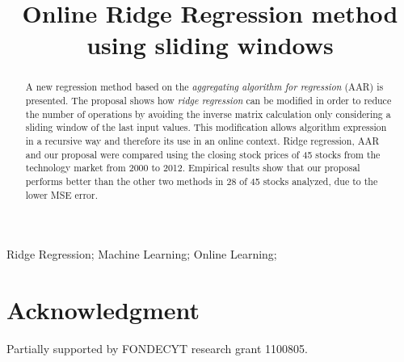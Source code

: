 \documentclass[10pt, conference, compsocconf]{IEEEtran}
\begin{document}
\title{Online Ridge Regression method using sliding windows}

\author{
\and
{}
}


\maketitle


\begin{abstract}
A new regression method based on the {\em aggregating algorithm for
regression} (AAR) is presented. The proposal shows how {\em ridge
regression} can be modified in order to reduce the number of
operations by avoiding the inverse matrix calculation only considering
a sliding window of the last input values. This modification allows
algorithm expression in a recursive way and therefore its use in an
online context. Ridge regression, AAR and our proposal were compared
using the closing stock prices of 45 stocks from the technology market
from 2000 to 2012. Empirical results show that our proposal performs
better than the other two methods in 28 of 45 stocks analyzed, due to
the lower MSE error.
\end{abstract}

\begin{IEEEkeywords}
Ridge Regression; Machine Learning; Online Learning;

\end{IEEEkeywords}


\IEEEpeerreviewmaketitle







\section*{Acknowledgment}
Partially supported by FONDECYT research grant 1100805.



\end{document}
